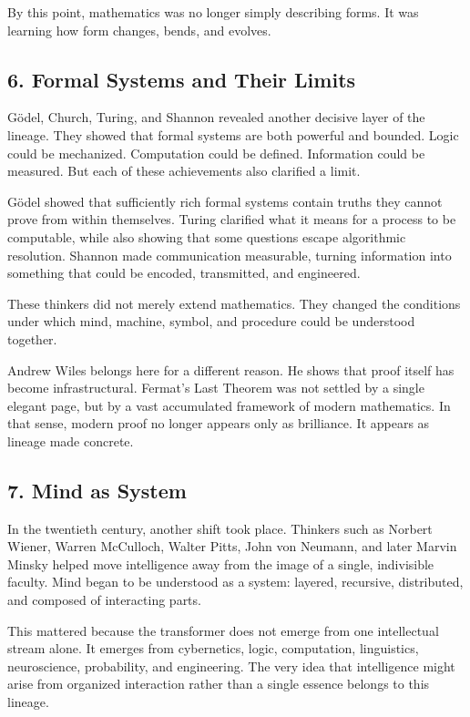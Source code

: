 \documentclass[
]{article}
\begin{document}
By this point, mathematics was no longer simply describing forms. It was
learning how form changes, bends, and evolves.

\hypertarget{formal-systems-and-their-limits}{%
\subsection{6. Formal Systems and Their
Limits}\label{formal-systems-and-their-limits}}

Gödel, Church, Turing, and Shannon revealed another decisive layer of
the lineage. They showed that formal systems are both powerful and
bounded. Logic could be mechanized. Computation could be defined.
Information could be measured. But each of these achievements also
clarified a limit.

Gödel showed that sufficiently rich formal systems contain truths they
cannot prove from within themselves. Turing clarified what it means for
a process to be computable, while also showing that some questions
escape algorithmic resolution. Shannon made communication measurable,
turning information into something that could be encoded, transmitted,
and engineered.

These thinkers did not merely extend mathematics. They changed the
conditions under which mind, machine, symbol, and procedure could be
understood together.

Andrew Wiles belongs here for a different reason. He shows that proof
itself has become infrastructural. Fermat's Last Theorem was not settled
by a single elegant page, but by a vast accumulated framework of modern
mathematics. In that sense, modern proof no longer appears only as
brilliance. It appears as lineage made concrete.

\hypertarget{mind-as-system}{%
\subsection{7. Mind as System}\label{mind-as-system}}

In the twentieth century, another shift took place. Thinkers such as
Norbert Wiener, Warren McCulloch, Walter Pitts, John von Neumann, and
later Marvin Minsky helped move intelligence away from the image of a
single, indivisible faculty. Mind began to be understood as a system:
layered, recursive, distributed, and composed of interacting parts.

This mattered because the transformer does not emerge from one
intellectual stream alone. It emerges from cybernetics, logic,
computation, linguistics, neuroscience, probability, and engineering.
The very idea that intelligence might arise from organized interaction
rather than a single essence belongs to this lineage.
\end{document}

